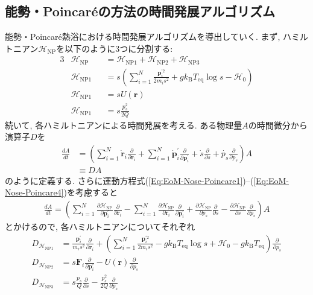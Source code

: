 \subsection{能勢・Poincar\'{e}の方法の時間発展アルゴリズム}
能勢・Poincar\'{e}熱浴における時間発展アルゴリズムを導出していく.
まず, ハミルトニアン$\mathcal{H}_{\mathrm{NP}}$を以下のように3つに分割する:
\begin{alignat}{3}
  &\mathcal{H}_{\mathrm{NP}}
  &&=
  \mathcal{H}_{\mathrm{NP1}} +
  \mathcal{H}_{\mathrm{NP2}} +
  \mathcal{H}_{\mathrm{NP3}}
  \\
  &\mathcal{H}_{\mathrm{NP1}}
  &&=
  s
  \left(
    \sum_{i=1}^{N}
    \frac{\bm{p}_{i}^{\prime 2}}{2m_{i}s^{2}}
    +
    g k_{\mathrm{B}} T_{\mathrm{eq}} \log s
    - \mathcal{H}_{0}
  \right)
  \\
  &\mathcal{H}_{\mathrm{NP1}}
  &&=
  s U(\bm{r})
  \\
  &\mathcal{H}_{\mathrm{NP1}}
  &&=
  s \frac{p_{s}^{2}}{2Q}
\end{alignat}
続いて, 各ハミルトニアンによる時間発展を考える. ある物理量$A$の時間微分から演算子$D$を
\begin{align}
  \frac{dA}{dt}
  &=
  \left(
    \sum_{i=1}^{N} \dot{\bm{r}}_{i}
    \frac{\partial}{\partial \bm{r}_{i}}
    +
    \sum_{i=1}^{N} \dot{\bm{p}}_{i}^{\prime}
    \frac{\partial}{\partial \bm{p}_{i}^{\prime}}
    +
    \dot{s}
    \frac{\partial}{\partial s}
    +
    \dot{p_{s}}
    \frac{\partial}{\partial p_{s}}
  \right)
  A
  \\
  &\equiv
  DA
\end{align}
のように定義する. さらに運動方程式(\ref{Eq:EoM-Nose-Poincare1})--(\ref{Eq:EoM-Nose-Poincare4})を考慮すると
\begin{align}
  \frac{dA}{dt}
  =
  \left(
    \sum_{i=1}^{N}
    \frac{\partial \mathcal{H}_{\mathrm{NP}}}{\partial \bm{p}_{i}^{\prime}}
    \frac{\partial}{\partial \bm{r}_{i}}
    -
    \sum_{i=1}^{N}
    \frac{\partial \mathcal{H}_{\mathrm{NP}}}{\partial \bm{r}_{i}}
    \frac{\partial}{\partial \bm{p}_{i}^{\prime}}
    +
    \frac{\partial \mathcal{H}_{\mathrm{NP}}}{\partial p_{s}}
    \frac{\partial}{\partial s}
    -
    \frac{\partial \mathcal{H}_{\mathrm{NP}}}{\partial s}
    \frac{\partial}{\partial p_{s}}
  \right)
  A
\end{align}
とかけるので, 各ハミルトニアンについてそれぞれ
\begin{align}
  D_{\mathcal{H}_{\mathrm{NP1}}}
  &=
  \frac{\bm{p}_{i}^{\prime}}{m_{i}s^{2}}
  \frac{\partial}{\partial \bm{r}_{i}}
  +
  \left(
    \sum_{i=1}^{N}
    \frac{\bm{p}_{i}^{\prime 2}}{2m_{i}s^{2}}
    -
    g k_{\mathrm{B}} T_{\mathrm{eq}} \log s
    +
    \mathcal{H}_{0}
    -
    g k_{\mathrm{B}} T_{\mathrm{eq}}
  \right)
  \frac{\partial}{\partial p_{s}}
  \\
  D_{\mathcal{H}_{\mathrm{NP2}}}
  &=
  s \bm{F}_{i} \frac{\partial}{\partial \bm{p}_{i}^{\prime}}
  -
  U(\bm{r}) \frac{\partial}{\partial p_{s}}
  \\
  D_{\mathcal{H}_{\mathrm{NP3}}}
  &=
  s \frac{p_{s}}{Q} \frac{\partial}{\partial s}
  -
  \frac{p_{s}^{2}}{2Q} \frac{\partial}{\partial p_{s}}
\end{align}
